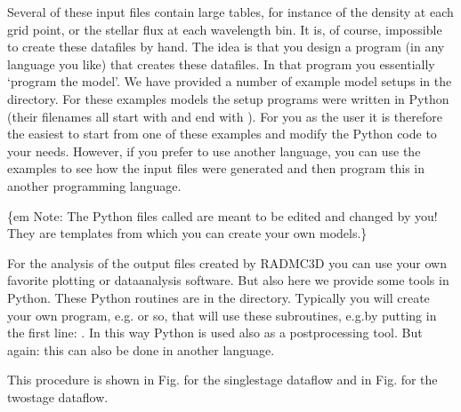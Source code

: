 \documentclass[letterpaper,10pt,english]{sphinxmanual}
\begin{document}
Several of these input files contain large tables, for instance of the density
at each grid point, or the stellar flux at each wavelength bin. It is, of
course, impossible to create these datafiles by hand. The idea is that you
design a program (in any language you like) that creates these datafiles. In
that program you essentially ‘program the model’. We have provided a number of
example model setups in the  directory. For these examples models
the setup programs were written in Python (their filenames all start with
 and end with ). For you as the user it is therefore the
easiest to start from one of these examples and modify the Python code to your
needs. However, if you prefer to use another language, you can use the examples
to see how the input files were generated and then program this in another
programming language.

\{em Note: The Python files called  are meant to be edited and
changed by you! They are templates from which you can create your own models.\}

For the analysis of the output files created by RADMC\sphinxhyphen{}3D you can use your own
favorite plotting or data\sphinxhyphen{}analysis software. But also here we provide some tools
in Python. These Python routines are in the  directory. Typically you
will create your own program, e.g. or so, that will use
these subroutines, e.g.by putting in the first line: . In this way Python is used also as a post\sphinxhyphen{}processing tool. But again: this
can also be done in another language.

This procedure is shown in Fig. {\hyperref[\detokenize{basicstructure:fig-dataflow-basic-python}]{}} for the
single\sphinxhyphen{}stage dataflow and in Fig. {\hyperref[\detokenize{basicstructure:fig-dataflow-twostage-python}]{}} for the
two\sphinxhyphen{}stage dataflow.
\end{document}
